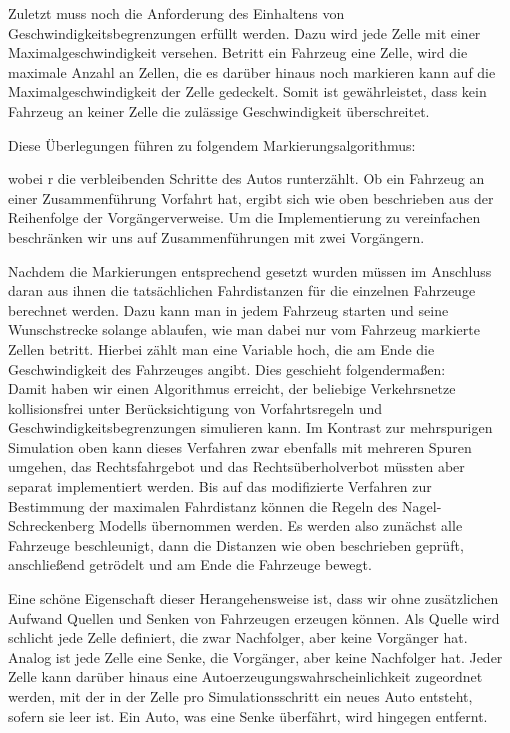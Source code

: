 \documentclass[10pt, a4paper]{article}
\begin{document}
Zuletzt muss noch die Anforderung des Einhaltens von Geschwindigkeitsbegrenzungen erfüllt werden. Dazu wird jede Zelle mit einer Maximalgeschwindigkeit versehen. Betritt ein Fahrzeug eine Zelle, wird die maximale Anzahl an Zellen, die es darüber hinaus noch markieren kann auf die Maximalgeschwindigkeit der Zelle gedeckelt. Somit ist gewährleistet, dass kein Fahrzeug an keiner Zelle die zulässige Geschwindigkeit überschreitet.

Diese Überlegungen führen zu folgendem Markierungsalgorithmus:

wobei r die verbleibenden Schritte des Autos runterzählt. Ob ein Fahrzeug an einer Zusammenführung Vorfahrt hat, ergibt sich wie oben beschrieben aus der Reihenfolge der Vorgängerverweise. Um die Implementierung zu vereinfachen beschränken wir uns auf Zusammenführungen mit zwei Vorgängern.

Nachdem die Markierungen entsprechend gesetzt wurden müssen im Anschluss daran aus ihnen die tatsächlichen Fahrdistanzen für die einzelnen Fahrzeuge berechnet werden. Dazu kann man in jedem Fahrzeug starten und seine Wunschstrecke solange ablaufen, wie man dabei nur vom Fahrzeug markierte Zellen betritt. Hierbei zählt man eine Variable hoch, die am Ende die Geschwindigkeit des Fahrzeuges angibt. Dies geschieht folgendermaßen:\\



Damit haben wir einen Algorithmus erreicht, der beliebige Verkehrsnetze kollisionsfrei unter Berücksichtigung von Vorfahrtsregeln und Geschwindigkeitsbegrenzungen simulieren kann. Im Kontrast zur mehrspurigen Simulation oben kann dieses Verfahren zwar ebenfalls mit mehreren Spuren umgehen, das Rechtsfahrgebot und das Rechtsüberholverbot müssten aber separat implementiert werden. Bis auf das modifizierte Verfahren zur Bestimmung der maximalen Fahrdistanz können die Regeln des Nagel-Schreckenberg Modells \cite{nagel-schreckenberg} übernommen werden. Es werden also zunächst alle Fahrzeuge beschleunigt, dann die Distanzen wie oben beschrieben geprüft, anschließend getrödelt und am Ende die Fahrzeuge bewegt.

Eine schöne Eigenschaft dieser Herangehensweise ist, dass wir ohne zusätzlichen Aufwand Quellen und Senken von Fahrzeugen erzeugen können. Als Quelle wird schlicht jede Zelle definiert, die zwar Nachfolger, aber keine Vorgänger hat. Analog ist jede Zelle eine Senke, die Vorgänger, aber keine Nachfolger hat. Jeder Zelle kann darüber hinaus eine Autoerzeugungswahrscheinlichkeit zugeordnet werden, mit der in der Zelle pro Simulationsschritt ein neues Auto entsteht, sofern sie leer ist. Ein Auto, was eine Senke überfährt, wird hingegen entfernt.
\end{document}
